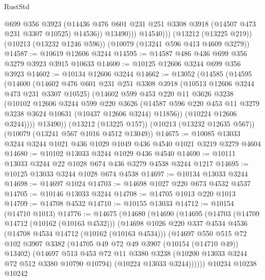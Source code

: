 \begin{lexlean}{RustStd}
\begin{coremodule}
                  @699
                  @356
                  @3923
                  (@14436 @476 @601 @231 @251 @3308 @3918 (@14507 @473 @231 @3307 @10525) @14536))
                @13490)))
          @14540)))
    (@13212 (@13225 @219))
    (@10213 (@13232 @1246 @596))
    (@10079 (@13241 @596 @413 @4609 @3279))
@14587 := @10619 @12606 @3244
@14595 := @14587 @486 @436 @699 @356 @3279 @3923 @3915 @10633
@14600 := @10125 @12606 @3244 @699 @356 @3923
@14602 := @10134 @12606 @3244
@14662 := @13052
    (@14585
      (@14595
        (@14600
          (@14602
            @476
            @601
            @231
            @251
            @3308
            @3918
            (@10513 @12606 @3244 @473 @231 @3307 @10525)
            (@14602
              @599
              @453
              @220
              @11
              @3626
              @3238
              (@10102
                @12606
                @3244
                @599
                @220
                @3626
                (@14587 @596 @220 @453 @11 @3279 @3238 @3624 @10631 (@10437 @12606 @3244) @11856))
              (@10224 @12606 @3244))))
        @13490))
    (@13212 (@13225 @157))
    (@10213 (@13232 @12635 @567))
    (@10079 (@13241 @567 @1016 @4512 @13049))
@14675 := @10085 @13033 @3244 @3244 @1021 @436 @1029 @1049 @436 @4540 @1021 @3219 @3279 @4604
@14680 := @10102 @13033 @3244 @1029 @436 @4540
@14690 := @10111 @13033 @3244 @22 @1028 @674 @436 @3279 @4538 @3244 @1217
@14695 := @10125 @13033 @3244 @1028 @674 @4538
@14697 := @10134 @13033 @3244
@14698 := @14697 @1024
@14703 := @14698 @1027 @220 @673 @4532 @4537
@14705 := @10146 @13033 @3244
@14708 := @14705 @1013 @220 @1013
@14709 := @14708 @4532
@14710 := @10155 @13033
@14712 := @10154 (@14710 @1013)
@14776 := @14675
    (@14680
      (@14690
        (@14695
          (@14703
            (@14709 @14712 (@10162 (@10163 @4532)))
            (@14698
              @1026
              @220
              @337
              @4534
              @4536
              (@14708 @4534 @14712 (@10162 (@10163 @4534)))
              (@14697
                @550
                @515
                @72
                @102
                @3907
                @3382
                (@14705 @49 @72 @49 @3907 (@10154 (@14710 @49)) @13402)
                (@14697
                  @513
                  @453
                  @72
                  @11
                  @3380
                  @3238
                  (@10200 @13033 @3244 @72 @512 @3380 @10790 @10794)
                  (@10224 @13033 @3244))))))
        @10234
        @10238
        @10242

\end{coremodule}
\end{lexlean}
